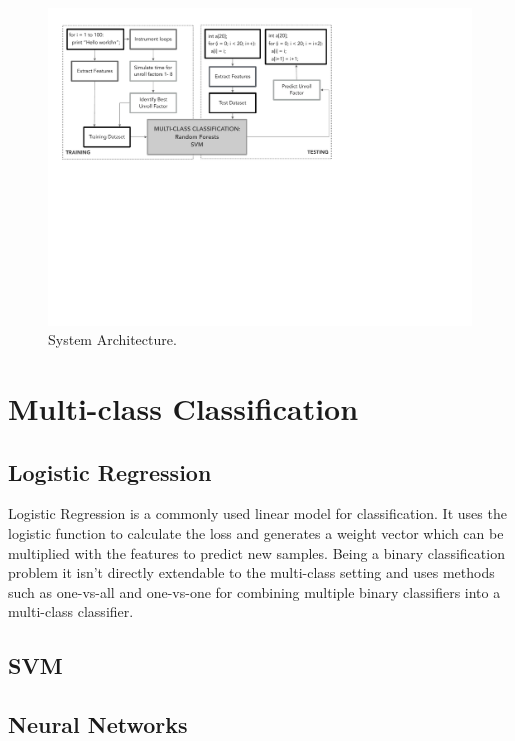 \documentclass[]{sig-alternate}
\begin{document}
\begin{figure}
  \center
  \includegraphics[width=0.9\linewidth]{fig/systemArchitecture.pdf}
  \caption{System Architecture.}
  \label{fig:systemArchitecture}
\end{figure}

\section{Multi-class Classification}
\label{sec:Multi-classClassification}


\subsection{Logistic Regression}
\label{subsec:LogisticRegression}

Logistic Regression is a commonly used linear model for classification. It uses the logistic function to calculate the loss and generates a weight vector which can be multiplied with the features to predict new samples. Being a binary classification problem it isn't directly extendable to the multi-class setting and uses methods such as one-vs-all and one-vs-one for combining multiple binary classifiers into a multi-class classifier.

\subsection{SVM}
\label{subsec:SVM}



\subsection{Neural Networks}
\label{subsec:NeuralNetworks}
\end{document}
